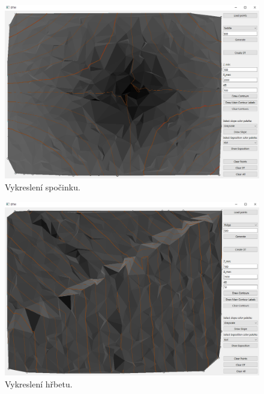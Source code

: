 \documentclass[a4paper, 12pt, oneside, titlepage]{article} %
\begin{document}
\begin{figure}[!htb]
	\centering
	\includegraphics[scale=0.45]{obrazky/spocinek.png} 
	\caption{Vykreslení spočinku.
	}
	\label{fig:spocinek}
\end{figure} 
\FloatBarrier

\begin{figure}[!htb]
	\centering
	\includegraphics[scale=0.45]{obrazky/hrbet.png} 
	\caption{Vykreslení hřbetu.
	}
	\label{fig:hrbet}
\end{figure} 
\FloatBarrier
\end{document}
